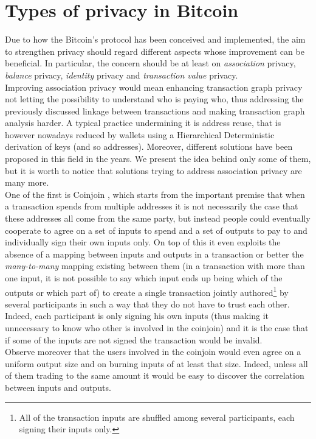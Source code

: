 \section{Types of privacy in Bitcoin}
Due to how the Bitcoin's protocol has been conceived and implemented, the aim to strengthen privacy should regard different aspects whose improvement can be beneficial. In particular, the concern should be at least on \textit{association} privacy, \textit{balance} privacy, \textit{identity} privacy and \textit{transaction value} privacy.\\
Improving association privacy would mean enhancing transaction graph privacy not letting the possibility to understand who is paying who, thus addressing the previously discussed linkage between transactions and making transaction graph analysis harder. A typical practice undermining it is address reuse, that is however nowadays reduced by wallets using a Hierarchical Deterministic derivation of keys (and so addresses). Moreover, different solutions have been proposed in this field in the years. We present the idea behind only some of them, but it is worth to notice that solutions trying to address association privacy are many more.\\ One of the first is Coinjoin \cite{Max13}, which starts from the important premise that when a transaction spends from multiple addresses it is not necessarily the case that these addresses all come from the same party, but instead people could eventually cooperate to agree on a set of inputs to spend and a set of outputs to pay to and individually sign their own inputs only. On top of this it even exploits the absence of a mapping between inputs and outputs in a transaction or better the \textit{many-to-many} mapping existing between them (in a transaction with more than one input, it is not possible to say which input ends up being which of the outputs or which part of) to create a single transaction jointly authored\footnote{All of the transaction inputs are shuffled among several participants, each signing their inputs only.} by several participants in such a way that they do not have to trust each other. Indeed, each participant is only signing his own inputs (thus making it unnecessary to know who other is involved in the coinjoin) and it is the case that if some of the inputs are not signed the transaction would be invalid.\\
Observe moreover that the users involved in the coinjoin would even agree on a uniform output size and on burning inputs of at least that size. Indeed, unless all of them trading to the same amount it would be easy to discover the correlation between inputs and outputs.\\ 
